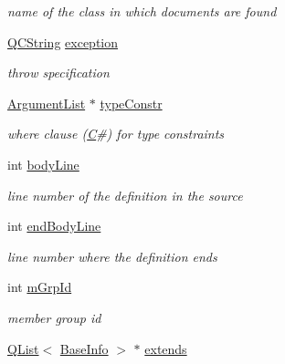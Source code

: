 \begin{DoxyCompactItemize}
\begin{DoxyCompactList}\small\item\em name of the class in which documents are found \end{DoxyCompactList}\item 
\hypertarget{class_entry_a280291809e546dd34aba1403610c285a}{\hyperlink{class_q_c_string}{Q\-C\-String} \hyperlink{class_entry_a280291809e546dd34aba1403610c285a}{exception}}\label{class_entry_a280291809e546dd34aba1403610c285a}

\begin{DoxyCompactList}\small\item\em throw specification \end{DoxyCompactList}\item 
\hypertarget{class_entry_af23889e5103d8fe74c2e27e379c13b7c}{\hyperlink{class_argument_list}{Argument\-List} $\ast$ \hyperlink{class_entry_af23889e5103d8fe74c2e27e379c13b7c}{type\-Constr}}\label{class_entry_af23889e5103d8fe74c2e27e379c13b7c}

\begin{DoxyCompactList}\small\item\em where clause (\hyperlink{class_c}{C}\#) for type constraints \end{DoxyCompactList}\item 
\hypertarget{class_entry_a65f510d2097d6d763dbfe0d9d338985c}{int \hyperlink{class_entry_a65f510d2097d6d763dbfe0d9d338985c}{body\-Line}}\label{class_entry_a65f510d2097d6d763dbfe0d9d338985c}

\begin{DoxyCompactList}\small\item\em line number of the definition in the source \end{DoxyCompactList}\item 
\hypertarget{class_entry_a525bd36b30664a88951a5ddaa21b716d}{int \hyperlink{class_entry_a525bd36b30664a88951a5ddaa21b716d}{end\-Body\-Line}}\label{class_entry_a525bd36b30664a88951a5ddaa21b716d}

\begin{DoxyCompactList}\small\item\em line number where the definition ends \end{DoxyCompactList}\item 
\hypertarget{class_entry_ad0a0e82223e5b37e410022d8ffe6ec3b}{int \hyperlink{class_entry_ad0a0e82223e5b37e410022d8ffe6ec3b}{m\-Grp\-Id}}\label{class_entry_ad0a0e82223e5b37e410022d8ffe6ec3b}

\begin{DoxyCompactList}\small\item\em member group id \end{DoxyCompactList}\item 
\hypertarget{class_entry_a15940f265602de9ceb62a5aa0b8cd878}{\hyperlink{class_q_list}{Q\-List}$<$ \hyperlink{struct_base_info}{Base\-Info} $>$ $\ast$ \hyperlink{class_entry_a15940f265602de9ceb62a5aa0b8cd878}{extends}}\label{class_entry_a15940f265602de9ceb62a5aa0b8cd878}


\end{DoxyCompactItemize}
